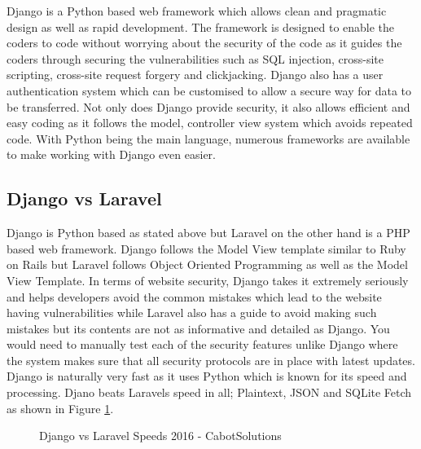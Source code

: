 \documentclass[../main.tex]{subfiles}
\begin{document}
\raggedright
Django is a Python based web framework which allows clean and pragmatic design as well as rapid development. The framework is designed to enable the coders to code without worrying about the security of the code as it guides the coders through securing the vulnerabilities such as SQL injection, cross-site scripting, cross-site request forgery and clickjacking. Django also has a user authentication system which can be customised to allow a secure way for data to be transferred\cite{django}. Not only does Django provide security, it also allows efficient and easy coding as it follows the model, controller view system which avoids repeated code. With Python being the main language, numerous frameworks are available to make working with Django even easier.\cite{whyusedjango} 

\subsection{Django vs Laravel}
Django is Python based as stated above but Laravel\cite{laravel} on the other hand is a PHP based web framework. Django follows the Model View template similar to Ruby on Rails but Laravel follows Object Oriented Programming as well as the Model View Template. In terms of website security, Django takes it extremely seriously and helps developers avoid the common mistakes which lead to the website having vulnerabilities while Laravel also has a guide to avoid making such mistakes but its contents are not as informative and detailed as Django. You would need to manually test each of the security features unlike Django where the system makes sure that all security protocols are in place with latest updates.
Django is naturally very fast as it uses Python which is known for its speed and processing. Djano beats Laravels speed in all; Plaintext, JSON and SQLite Fetch\cite{djangovslaravel} as shown in Figure \ref{fig:djangovslaravelsp}.

\begin{figure}[H]
        \caption{\label{fig:djangovslaravelsp} Django vs Laravel Speeds 2016 - CabotSolutions\cite{djangovslaravel}}
      \end{figure}
      
\end{document}
